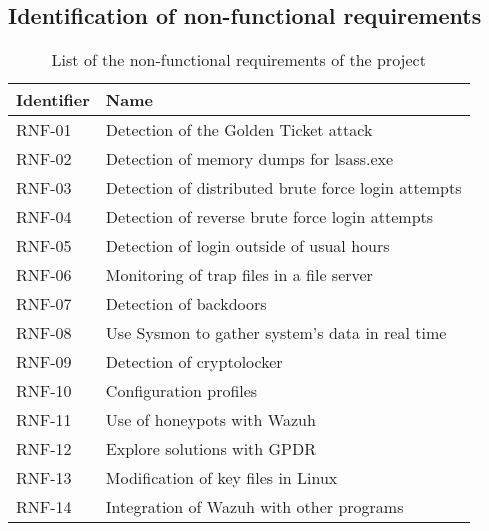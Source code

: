 \subsection{Identification of non-functional requirements}
\newcommand{\RNFuno}{Detection of the Golden Ticket attack}
\newcommand{\RNFdos}{Detection of memory dumps for lsass.exe}
\newcommand{\RNFtres}{Detection of distributed brute force login attempts}
\newcommand{\RNFcuatro}{Detection of reverse brute force login attempts}
\newcommand{\RNFcinco}{Detection of login outside of usual hours}
\newcommand{\RNFseis}{Monitoring of trap files in a file server}
\newcommand{\RNFsiete}{Detection of backdoors}
\newcommand{\RNFocho}{Use Sysmon to gather system's data in real time}
\newcommand{\RNFnueve}{Detection of cryptolocker}
\newcommand{\RNFdiez}{Configuration profiles}
\newcommand{\RNFonce}{Use of honeypots with Wazuh}
\newcommand{\RNFdoce}{Explore solutions with GPDR}
\newcommand{\RNFtrece}{Modification of key files in Linux}
\newcommand{\RNFcatorce}{Integration of Wazuh with other programs}

\begin{table}[H]
	\begin{tabularx}{\textwidth}{|l|X|}
		\hline
		\rowcolor{gray!30}
		Identifier & Name \\ \hline
		RNF-01 & \RNFuno \\ \hline
		RNF-02 & \RNFdos \\ \hline
		RNF-03 & \RNFtres \\ \hline
		RNF-04 & \RNFcuatro \\ \hline
		RNF-05 & \RNFcinco \\ \hline
		RNF-06 & \RNFseis \\ \hline
		RNF-07 & \RNFsiete \\ \hline
		RNF-08 & \RNFocho \\ \hline
		RNF-09 & \RNFnueve \\ \hline
		RNF-10 & \RNFdiez \\ \hline
		RNF-11 & \RNFonce \\ \hline
		RNF-12 & \RNFdoce \\ \hline
		RNF-13 & \RNFtrece \\ \hline
		RNF-14 & \RNFcatorce \\ \hline
	\end{tabularx}
	\caption{List of the non-functional requirements of the project}
\end{table}

